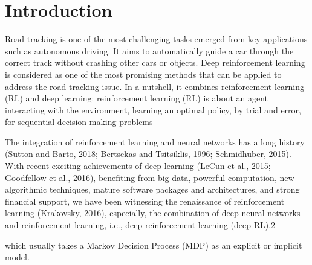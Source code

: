 \documentclass{svproc}
\begin{document}
\section{Introduction}

Road tracking is one of the most challenging tasks emerged from key applications such as autonomous driving. It aims to automatically guide a car through the correct track without crashing other cars or objects. Deep reinforcement learning \cite{} is considered as one of the most promising %
methods that can be applied to address the road tracking issue. In a nutshell, it combines reinforcement learning (RL) and deep learning: reinforcement learning (RL) is about an agent interacting with the environment, learning an optimal policy, by trial and error, for sequential decision making problems

The integration of reinforcement learning and neural networks has a long history (Sutton and Barto,
2018; Bertsekas and Tsitsiklis, 1996; Schmidhuber, 2015). With recent exciting achievements of
deep learning (LeCun et al., 2015; Goodfellow et al., 2016), benefiting from big data, powerful
computation, new algorithmic techniques, mature software packages and architectures, and strong
financial support, we have been witnessing the renaissance of reinforcement learning (Krakovsky,
2016), especially, the combination of deep neural networks and reinforcement learning, i.e., deep
reinforcement learning (deep RL).2




which usually %
takes a Markov Decision Process (MDP) as an explicit or implicit model. %
\end{document}
